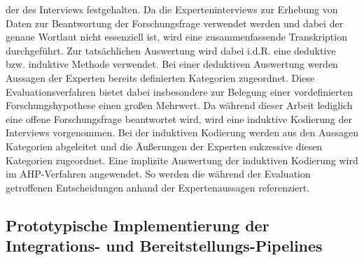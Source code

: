 der des Interviews festgehalten. Da die Experteninterviews zur Erhebung von Daten zur Beantwortung der Forschungsfrage verwendet werden und dabei der genaue Wortlaut nicht essenziell ist, wird eine zusammenfassende Transkription durchgeführt. Zur tatsächlichen Auswertung wird dabei i.d.R. eine deduktive bzw. induktive Methode verwendet. Bei einer deduktiven Auswertung werden Aussagen der Experten bereits definierten Kategorien zugeordnet. Diese Evaluationsverfahren bietet dabei insbesondere zur Belegung einer vordefinierten Forschungshypothese einen großen Mehrwert. Da während dieser Arbeit lediglich eine offene Forschungsfrage beantwortet wird, wird eine induktive Kodierung der Interviews vorgenommen. Bei der induktiven Kodierung werden aus den Aussagen Kategorien abgeleitet und die Äußerungen der Experten sukzessive diesen Kategorien zugeordnet. Eine implizite Auswertung der induktiven Kodierung wird im AHP-Verfahren angewendet. So werden die während der Evaluation getroffenen Entscheidungen anhand der Expertenaussagen referenziert.

\subsection{Prototypische Implementierung der Integrations- und Bereitstellungs-Pipelines}

